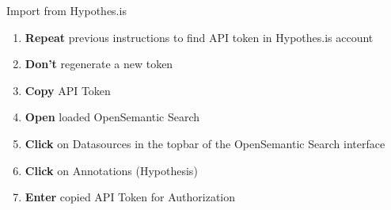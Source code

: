 \documentclass[10pt,a4paper]{article}
\begin{document}
\begin{textbox}{Import from Hypothes.is}

  

\begin{enumerate}
\item \textbf{Repeat} previous instructions to find API token in Hypothes.is account 
\item \textbf{Don't} regenerate a new token
\item \textbf{Copy} API Token
\item \textbf{Open} loaded OpenSemantic Search
\item \textbf{Click} on Datasources in the topbar of the OpenSemantic Search interface
\item \textbf{Click} on Annotations (Hypothesis)
\item \textbf{Enter} copied API Token for Authorization
\end{enumerate}


\end{textbox}
\end{document}
